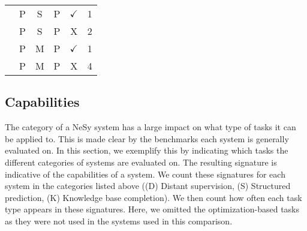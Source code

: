 \begin{table}[ht!]
\begin{tabular}{@{}l|ccc|c|r@{}}
                                 & P               & S         & P                    & $\checkmark$                 & 1          \\
                                 & P               & S         & P                    &             X       & 2          \\
                                 & P               & M         & P                    & $\checkmark$                 & 1          \\
                                 & P               & M         & P                    &               X     & 4          \\ \bottomrule
\end{tabular}
\end{table}

\subsection{Capabilities}
The category of a NeSy system has a large impact on what type of tasks it can be applied to. This is made clear by the benchmarks each system is generally evaluated on. In this section, we exemplify this by indicating which tasks the different categories of systems are evaluated on. The resulting signature is indicative of the capabilities of a system. We count these signatures for each system in the categories listed above ((D) Distant supervision, (S) Structured prediction, (K) Knowledge base completion). We then count how often each task type appears in these signatures. Here, we omitted the optimization-based tasks as they were not used in the systems used in this comparison.

